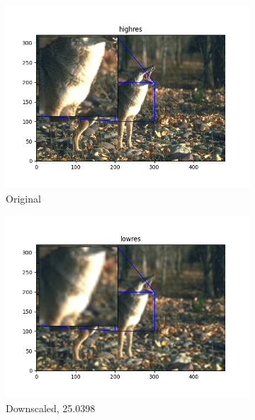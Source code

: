 \documentclass[12pt]{article}
\begin{document}
\begin{figure}[h!]
  \begin{subfigure}[b]{0.32\linewidth}
    \includegraphics[width=\linewidth]{./1-highres.png}
    \caption{Original}
  \end{subfigure}
  \hfill
  \begin{subfigure}[b]{0.32\linewidth}
    \includegraphics[width=\linewidth]{./1-lowres.png}
    \caption{Downscaled, 25.0398}
  \end{subfigure}
  \hfill
  \begin{subfigure}[b]{0.32\linewidth}

\end{subfigure}
\end{figure}
\end{document}
